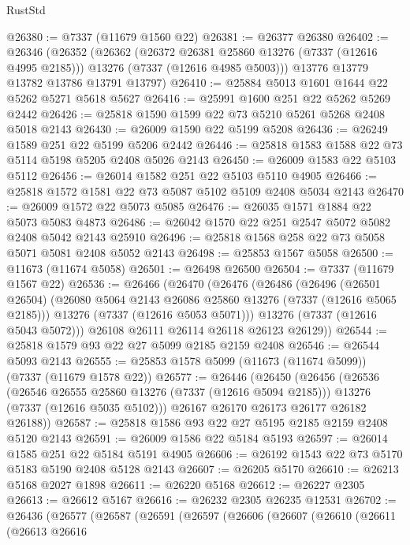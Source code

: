 \begin{lexlean}{RustStd}
\begin{coremodule}
@26380 := @7337 (@11679 @1560 @22)
@26381 := @26377 @26380
@26402 := @26346
    (@26352
      (@26362
        (@26372 @26381 @25860 @13276 (@7337 (@12616 @4995 @2185)))
        @13276
        (@7337 (@12616 @4985 @5003)))
      @13776
      @13779
      @13782
      @13786
      @13791
      @13797)
@26410 := @25884 @5013 @1601 @1644 @22 @5262 @5271 @5618 @5627
@26416 := @25991 @1600 @251 @22 @5262 @5269 @2442
@26426 := @25818 @1590 @1599 @22 @73 @5210 @5261 @5268 @2408 @5018 @2143
@26430 := @26009 @1590 @22 @5199 @5208
@26436 := @26249 @1589 @251 @22 @5199 @5206 @2442
@26446 := @25818 @1583 @1588 @22 @73 @5114 @5198 @5205 @2408 @5026 @2143
@26450 := @26009 @1583 @22 @5103 @5112
@26456 := @26014 @1582 @251 @22 @5103 @5110 @4905
@26466 := @25818 @1572 @1581 @22 @73 @5087 @5102 @5109 @2408 @5034 @2143
@26470 := @26009 @1572 @22 @5073 @5085
@26476 := @26035 @1571 @1884 @22 @5073 @5083 @4873
@26486 := @26042 @1570 @22 @251 @2547 @5072 @5082 @2408 @5042 @2143 @25910
@26496 := @25818 @1568 @258 @22 @73 @5058 @5071 @5081 @2408 @5052 @2143
@26498 := @25853 @1567 @5058
@26500 := @11673 (@11674 @5058)
@26501 := @26498 @26500
@26504 := @7337 (@11679 @1567 @22)
@26536 := @26466
    (@26470
      (@26476
        (@26486
          (@26496
            (@26501 @26504)
            (@26080 @5064 @2143 @26086 @25860 @13276 (@7337 (@12616 @5065 @2185)))
            @13276
            (@7337 (@12616 @5053 @5071)))
          @13276
          (@7337 (@12616 @5043 @5072)))
        @26108
        @26111
        @26114
        @26118
        @26123
        @26129))
@26544 := @25818 @1579 @93 @22 @27 @5099 @2185 @2159 @2408
@26546 := @26544 @5093 @2143
@26555 := @25853 @1578 @5099 (@11673 (@11674 @5099)) (@7337 (@11679 @1578 @22))
@26577 := @26446
    (@26450
      (@26456
        (@26536
          (@26546 @26555 @25860 @13276 (@7337 (@12616 @5094 @2185)))
          @13276
          (@7337 (@12616 @5035 @5102)))
        @26167
        @26170
        @26173
        @26177
        @26182
        @26188))
@26587 := @25818 @1586 @93 @22 @27 @5195 @2185 @2159 @2408 @5120 @2143
@26591 := @26009 @1586 @22 @5184 @5193
@26597 := @26014 @1585 @251 @22 @5184 @5191 @4905
@26606 := @26192 @1543 @22 @73 @5170 @5183 @5190 @2408 @5128 @2143
@26607 := @26205 @5170
@26610 := @26213 @5168 @2027 @1898
@26611 := @26220 @5168
@26612 := @26227 @2305
@26613 := @26612 @5167
@26616 := @26232 @2305 @26235 @12531
@26702 := @26436
    (@26577
      (@26587
        (@26591
          (@26597
            (@26606
              (@26607
                (@26610
                  (@26611
                    (@26613
                      @26616

\end{coremodule}
\end{lexlean}
